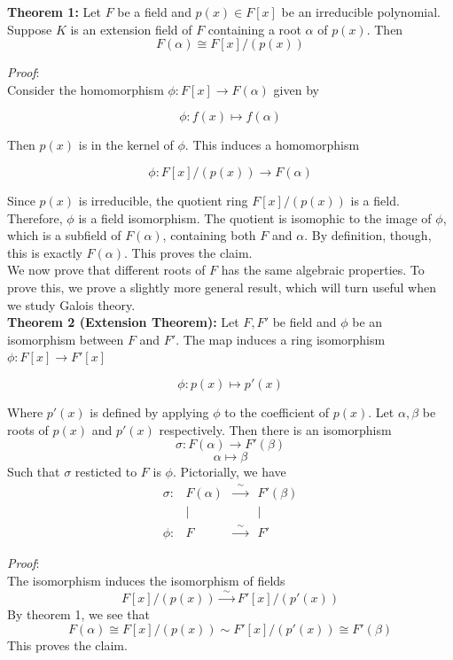 \documentclass[11pt]{article}
\begin{document}
\textbf{Theorem 1:} Let $F$ be a field and $p(x)\in F[x]$ be an irreducible polynomial. Suppose $K$ is an extension field of $F$ containing a root $\alpha$ of $p(x)$. Then 
\[F(\alpha) \cong F[x]/(p(x))\]

\textit{Proof}:\\
Consider the homomorphism $\phi: F[x] \to F(\alpha)$ given by 

\[\phi: f(x) \mapsto f(\alpha)\]

Then $p(x)$ is in the kernel of $\phi$. This induces a homomorphism 

\[\phi: F[x]/(p(x)) \to F(\alpha)\]

Since $p(x)$ is irreducible, the quotient ring $F[x]/(p(x))$ is a field. Therefore, $\phi$ is a field isomorphism. The quotient is isomophic to the image of $\phi$, which is a subfield of $F(\alpha)$, containing both $F$ and $\alpha$. By definition, though, this is exactly $F(\alpha)$. This proves the claim. \\

We now prove that different roots of $F$ has the same algebraic properties. To prove this, we prove a slightly more general result, which will turn useful when we study Galois theory. \\

\textbf{Theorem 2 (Extension Theorem):} Let $F, F'$ be field and $\phi$ be an isomorphism between $F$ and $F'$. The map induces a ring isomorphism $\phi: F[x] \to F'[x]$

\[\phi: p(x) \mapsto p'(x)\]

Where $p'(x)$ is defined by applying $\phi$ to the coefficient of $p(x)$. Let $\alpha, \beta$ be roots of $p(x)$ and $p'(x)$ respectively. Then there is an isomorphism 
\[\sigma: F(\alpha) \to F'(\beta)\]
\[\alpha \mapsto \beta\]
Such that $\sigma$ resticted to $F$ is $\phi$. Pictorially, we have 
\[
\begin{array}{cccc}
\sigma: & F(\alpha) & \xrightarrow{\ \ \sim\ \ } & F'(\beta) \\
& \big\vert &  & \big\vert \\
\phi: & F & \xrightarrow{\ \ \sim\ \ } & F'
\end{array}
\]

\textit{Proof}:\\
The isomorphism induces the isomorphism of fields 
\[F[x] / (p(x)) \xrightarrow{\ \ \sim\ \ } F'[x] / (p'(x))\]
By theorem 1, we see that 
\[F(\alpha) \cong F[x] / (p(x)) \sim F'[x] / (p'(x)) \cong F'(\beta)\]
This proves the claim. \\
\end{document}
